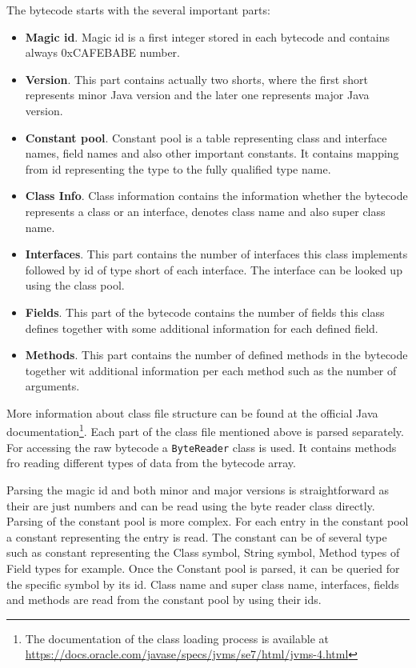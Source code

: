 The bytecode starts with the several important parts:
\begin{itemize}
	\item \textbf{Magic id}. Magic id is a first integer stored in each bytecode and contains  always 0xCAFEBABE number.
	\item \textbf{Version}. This part contains actually two shorts, where the first short represents minor Java version and the later one represents major Java version.
	\item \textbf{Constant pool}. Constant pool is a table representing class and interface names, field names and also other important constants. It contains mapping from id representing the type to the fully qualified type name.
	\item \textbf{Class Info}. Class information contains the information whether the bytecode represents a class or an interface, denotes class name and also super class name.
	\item \textbf{Interfaces}. This part contains the number of interfaces this class implements followed by id of type short of each interface. The interface can be looked up using the class pool.
	\item \textbf{Fields}. This part of the bytecode contains the number of fields this class defines together with some additional information for each defined field.
	\item \textbf{Methods}. This part contains the number of defined methods in the bytecode together wit additional information per each method such as the number of arguments.
\end{itemize}
More information about class file structure can be found at the official Java documentation\footnote{The documentation of the class loading process is available at \url{https://docs.oracle.com/javase/specs/jvms/se7/html/jvms-4.html}}.
Each part of the class file mentioned above is parsed separately. For accessing the raw bytecode a \texttt{ByteReader} class is used. It contains methods fro reading different types of data from the bytecode array. 

Parsing the magic id and both minor and major versions is straightforward as their are just numbers and can be read using the byte reader class directly. Parsing of the constant pool is more complex. For each entry in the constant pool a constant representing the entry is read. The constant can be of several type such as constant representing the Class symbol, String symbol, Method types of Field types for example. Once the Constant pool is parsed, it can be queried for the specific symbol by its id. Class name and super class name, interfaces, fields and methods are read from the constant pool by using their ids.

